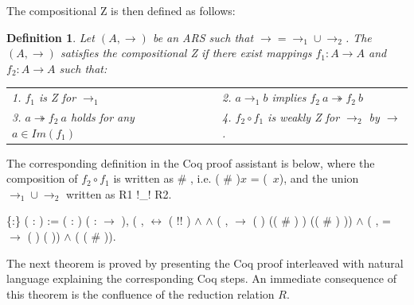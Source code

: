 \documentclass[a4paper]{article}
\newcommand{\tto}{\twoheadrightarrow}
\newtheorem{definition}{Definition}[section]
\begin{document}
The compositional Z is then defined as follows:

\begin{definition}\cite{Nakazawa-Fujita2016}
  Let $(A,\to)$ be an ARS such that $\to = \to_1 \cup \to_2$. The
  $(A,\to)$ satisfies the compositional Z if there exist mappings
  $f_1:A \to A$ and $f_2:A \to A$ such that:
  \begin{tabular}{lll}
  1. $f_1$ is Z for $\to_1$ && 2. $a \to_1 b$ implies $f_2\ a \tto f_2\ b$ \\
  3. $a \tto f_2\ a$ holds for any $a \in Im(f_1)$ &&
  4. $f_2\circ f_1$ is weakly Z for $\to_2$ by $\to$.
  \end{tabular}
\end{definition}

The corresponding definition in the Coq proof assistant is below,
where the composition of $f_2\circ f_1$ is written as 
\# , i.e. ( \# )$x$ =
(\ $x$), and the union $\to_1 \cup \to_2$
written as R1 !\_! R2.

\begin{coqdoccode}
  \coqdocemptyline \coqdocnoindent {}
   \{:\} (
  : ) := \coqdoctac{\ensuremath{\exists}}
  ( :  )
  ( : 
  \ensuremath{\rightarrow} ), (\coqdockw{\ensuremath{\forall}}  ,    \ensuremath{\leftrightarrow} ( !\coqdocvar{\_}! ) \ensuremath{\land}
    
  \ensuremath{\land} (\coqdockw{\ensuremath{\forall}} 
  ,   
  \ensuremath{\rightarrow} ( )
  (( \# ) ) (( \# ) ))
  \ensuremath{\land} (\coqdockw{\ensuremath{\forall}} 
  ,  =  
  \ensuremath{\rightarrow} ( )
   ( )) \ensuremath{\land}
  (  
  ( \# )).\coqdoceol \coqdocemptyline
  \coqdocemptyline
\end{coqdoccode}

The next theorem is proved by presenting the Coq proof interleaved with natural language explaining the corresponding Coq steps. An immediate consequence of this theorem is the confluence of the reduction relation $R$.
\end{document}
